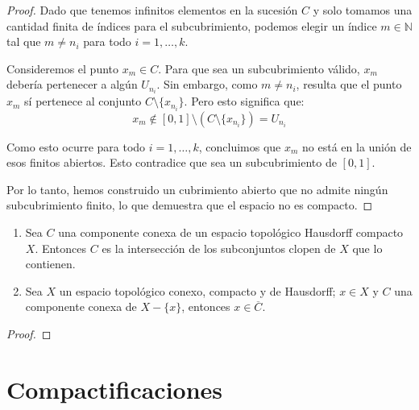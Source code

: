 \documentclass{article}
\theoremstyle{plain}
\theoremstyle{definition}
\newcommand{\cl}[1]{\overline{#1}}              %
\newenvironment{ejercicio}[1]{\begin{trivlist}
\item[\hskip \labelsep {\bfseries Ejercicio}\hskip \labelsep {\bfseries #1.}]}{\end{trivlist}}
\begin{document}
\begin{proof}
    Dado que tenemos infinitos elementos en la sucesión \( C \) y solo tomamos una cantidad finita de índices para el subcubrimiento, podemos elegir un índice \( m \in \mathbb{N} \) tal que \( m \neq n_i \) para todo \( i = 1, \dots, k \).

    Consideremos el punto \( x_m \in C \). Para que sea un subcubrimiento válido, \( x_m \) debería pertenecer a algún \( U_{n_i} \). Sin embargo, como \( m \neq n_i \), resulta que el punto \( x_m \) sí pertenece al conjunto \( C \setminus \{ x_{n_i} \} \). Pero esto significa que:\[
        x_m \notin [0, 1] \setminus (C \setminus \{ x_{n_i} \}) = U_{n_i}
    \]

    Como esto ocurre para todo \( i = 1, \dots, k \), concluimos que \( x_m \) no está en la unión de esos finitos abiertos. Esto contradice que sea un subcubrimiento de \( [0, 1] \).

    Por lo tanto, hemos construido un cubrimiento abierto que no admite ningún subcubrimiento finito, lo que demuestra que el espacio no es compacto.
\end{proof}

\begin{ejercicio}{11}
    \begin{enumerate}
        \item[(a)] Sea \( C \) una componente conexa de un espacio topológico Hausdorff compacto \( X \). Entonces \( C \) es la intersección de los subconjuntos clopen de \( X \) que lo contienen.
        \item[(b)] Sea \( X \) un espacio topológico conexo, compacto y de Hausdorff; \( x \in X \) y \( C \) una componente conexa de \( X - \{ x \} \), entonces \( x \in \cl{C} \).
    \end{enumerate}
\end{ejercicio}
\begin{proof}

\end{proof}

\section{Compactificaciones}
\end{document}
